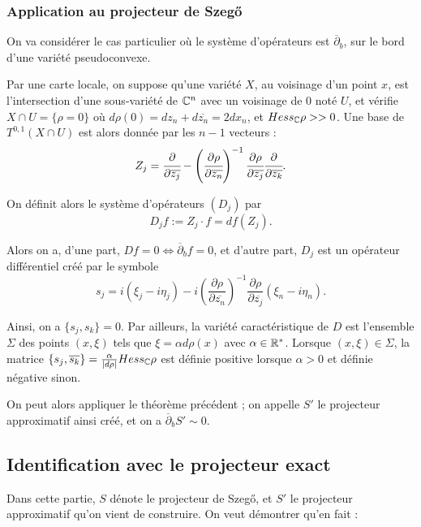 \subsubsection{Application au projecteur de Szeg\H{o}}
On va considérer le cas particulier où le système d'opérateurs est $\overline{\partial}_b$, sur le bord d'une variété pseudoconvexe.

Par une carte locale, on suppose qu'une variété $X$, au voisinage d'un point $x$, est l'intersection d'une sous-variété de $\mathbb{C}^n$ avec un voisinage de $0$ noté $U$, et vérifie $X \cap U=\{\rho=0\}$ où $d\rho(0)=dz_n + d\overline{z_n} = 2dx_n$, et $Hess_{\mathbb{C}}\rho >>0$. Une base de $T^{0,1}(X\cap U)$ est alors donnée par les $n-1$ vecteurs :
\begin{equation*}
  Z_j = \cfrac{\partial}{\partial \overline{z_j}} - \left(\cfrac{\partial \rho}{\partial \overline{z_n}}\right)^{-1} \cfrac{\partial \rho}{\partial \overline{z_j}} \cfrac{\partial}{\partial \overline{z_k}}.
\end{equation*}

\noindent On définit alors le système d'opérateurs $(D_j)$ par 
\begin{equation*}
  D_jf := Z_j\cdot f = df(Z_j).
\end{equation*}

Alors on a, d'une part, $Df = 0 \Leftrightarrow \overline{\partial}_bf = 0$, et d'autre part, $D_j$ est un opérateur différentiel créé par le symbole 
\begin{equation*}
  s_j = i(\xi_j - i \eta_j) - i\left(\frac{\partial \rho}{\partial \overline{z_n}}\right)^{-1}\frac{\partial \rho}{\partial \overline{z_j}}(\xi_n - i \eta_n).
\end{equation*}

\noindent Ainsi, on a $\{s_j, s_k\}=0$. Par ailleurs, la variété caractéristique de $D$ est l'ensemble $\Sigma$ des points $(x,\xi)$ tels que $\xi = \alpha d\rho(x)$ avec $\alpha \in \mathbb{R}^*$. Lorsque $(x,\xi)\in \Sigma$, la matrice $\{s_j, \overline{s_k}\} = \frac{\alpha}{|d\rho|}Hess_{\mathbb{C}}\rho$ est définie positive lorsque $\alpha > 0$ et définie négative sinon.

On peut alors appliquer le théorème précédent ; on appelle $S'$ le projecteur approximatif ainsi créé, et on a $\overline{\partial}_bS'\sim0$.

\subsection{Identification avec le projecteur exact}
Dans cette partie, $S$ dénote le projecteur de Szeg\H{o}, et $S'$ le projecteur approximatif qu'on vient de construire. On veut démontrer qu'en fait :

